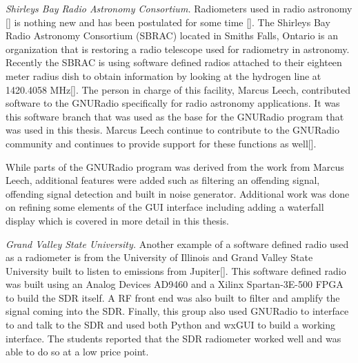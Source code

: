 
\emph{Shirleys Bay Radio Astronomy Consortium.}  Radiometers used in radio astronomy [\cite{Tiuri}] is nothing new and has been postulated for some time [\cite{Ohm}].  The Shirleys Bay Radio Astronomy Consortium (SBRAC) located in Smiths Falls, Ontario is an organization that is restoring a radio telescope used for radiometry in astronomy.  Recently the SBRAC is using software defined radios attached to their eighteen meter radius dish to obtain information by looking at the hydrogen line at 1420.4058 MHz[\cite{Leech2007}].  The person in charge of this facility, Marcus Leech, contributed software to the GNURadio specifically for radio astronomy applications.  It was this software branch that was used as the base for the GNURadio program that was used in this thesis.  Marcus Leech continue to contribute to the GNURadio community and continues to provide support for these functions as well[\cite{Leech}].

While parts of the GNURadio program was derived from the work from Marcus Leech, additional features were added such as filtering an offending signal, offending signal detection and built in noise generator.  Additional work was done on refining some elements of the GUI interface including adding a waterfall display which is covered in more detail in this thesis.

\emph{Grand Valley State University.}  Another example of a software defined radio used as a radiometer is from the University of Illinois and Grand Valley State University built to listen to emissions from Jupiter[\cite{Behnke}].  This software defined radio was built using an Analog Devices AD9460 and a Xilinx Spartan-3E-500 FPGA to build the SDR itself.  A RF front end was also built to filter and amplify the signal coming into the SDR.  Finally, this group also used GNURadio to interface to and talk to the SDR and used both Python and wxGUI to build a working interface.  The students reported that the SDR radiometer worked well and was able to do so at a low price point.

